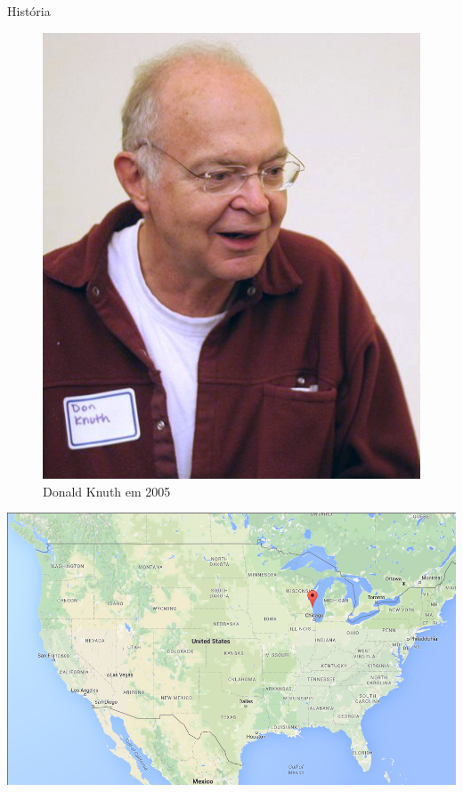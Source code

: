 \begin{frame}[standout]
  \Huge História
\end{frame}

\begin{frame}[plain]
  \begin{figure}[h]
    \includegraphics[scale=.5]{imagens/knuth}
    \caption{Donald Knuth em 2005}
  \end{figure}
\end{frame}

\begin{frame}[plain]
  \hspace*{-11.5mm}
  \begin{centering}
    \includegraphics[width=\pagewidth]{imagens/milwaukee}
  \end{centering}
\end{frame}

